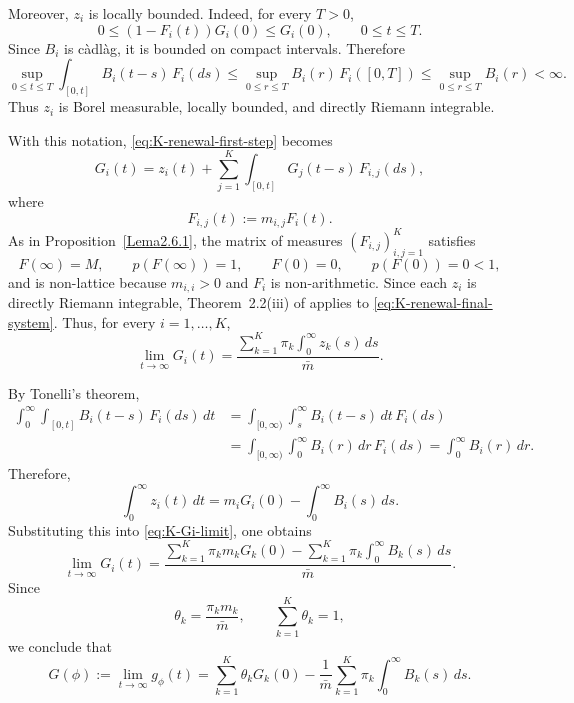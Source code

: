 \documentclass[reqno,final,11pt]{amsart}
\newcommand{\1}{\mathbbm{1}}
\renewcommand{\cite}{\citet}
\theoremstyle{plain}
\theoremstyle{definition}
\theoremstyle{remark}
\begin{document}
Moreover, \(z_i\) is locally bounded. Indeed, for every \(T>0\),
\[
0\le (1-F_i(t))G_i(0)\le G_i(0),
\qquad 0\le t\le T.
\]
Since \(B_i\) is càdlàg, it is bounded on compact intervals. Therefore
\[
\sup_{0\le t\le T}
\int_{[0,t]}B_i(t-s)\,F_i(ds)
\le
\sup_{0\le r\le T}B_i(r)\,F_i([0,T])
\le
\sup_{0\le r\le T}B_i(r)
<\infty .
\]
Thus \(z_i\) is Borel measurable, locally bounded, and directly Riemann
integrable.

With this notation, \eqref{eq:K-renewal-first-step} becomes
\begin{equation}\label{eq:K-renewal-final-system}
 G_i(t)
 =
 z_i(t)
 +
 \sum_{j=1}^K
 \int_{[0,t]}G_j(t-s)\,F_{i,j}(ds),
 \end{equation}
where
\[
F_{i,j}(t):=m_{i,j}F_i(t).
\]
As in Proposition~\ref{Lema2.6.1}, the matrix of measures
\((F_{i,j})_{i,j=1}^K\) satisfies
\[
F(\infty)=M,
\qquad
p(F(\infty))=1,
\qquad
F(0)=0,
\qquad
p(F(0))=0<1,
\]
and is non-lattice because \(m_{i,i}>0\) and \(F_i\) is non-arithmetic. Since each
\(z_i\) is directly Riemann integrable, Theorem~2.2\textup{(iii)} of \cite{Athreya2}
applies to \eqref{eq:K-renewal-final-system}. Thus, for every \(i=1,\dots,K\),
\begin{equation}\label{eq:K-Gi-limit}
\lim_{t\to\infty}G_i(t)
=
\frac{
\sum_{k=1}^K\pi_k\int_0^\infty z_k(s)\,ds
}{\bar m}.
\end{equation}

By Tonelli's theorem,
\[
\begin{split}
 \int_0^\infty
 \int_{[0,t]}B_i(t-s)\,F_i(ds)\,dt
 &=
 \int_{[0,\infty)}
 \int_s^\infty B_i(t-s)\,dt\,F_i(ds)
 \\
 &=
 \int_{[0,\infty)}
 \int_0^\infty B_i(r)\,dr\,F_i(ds)
 =
 \int_0^\infty B_i(r)\,dr.
 \end{split}
 \]
Therefore,
\[
\int_0^\infty z_i(t)\,dt
=
m_iG_i(0)
-
\int_0^\infty B_i(s)\,ds.
\]
Substituting this into \eqref{eq:K-Gi-limit}, one obtains
\[
\lim_{t\to\infty}G_i(t)
=
\frac{
\sum_{k=1}^K\pi_km_kG_k(0)
-
\sum_{k=1}^K\pi_k\int_0^\infty B_k(s)\,ds
}{\bar m}.
\]
Since
\[
\theta_k=\frac{\pi_km_k}{\bar m},
\qquad
\sum_{k=1}^K\theta_k=1,
\]
we conclude that
\begin{equation}\label{eq:K-G-limit}
G(\phi)
:=
\lim_{t\to\infty}g_\phi(t)
=
\sum_{k=1}^K\theta_kG_k(0)
-
\frac1{\bar m}
\sum_{k=1}^K\pi_k\int_0^\infty B_k(s)\,ds.
\end{equation}
\end{document}
